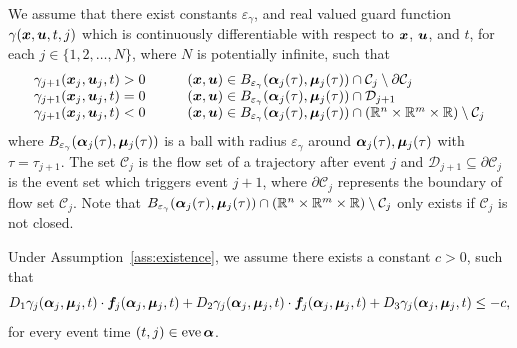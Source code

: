 \documentclass[../DC2019003Bouma.tex]{subfiles}
\begin{document}
\begin{sloppypar}
\begin{myass}\label{ass:existence}
We assume that there exist constants $\varepsilon_\gamma$, and real valued guard function $\gamma({\boldsymbol{x}},{\boldsymbol{u}},t,j)$ which is continuously differentiable with respect to ${\boldsymbol{x}}$, ${\boldsymbol{u}}$, and $t$, for each $j\in \{1,2,\dots,N\}$, where $N$ is potentially infinite, such that
\begin{equation}
\begin{array}{llll}
\gamma_{j+1}({\boldsymbol{x}}_j,{\boldsymbol{u}}_j,t) > 0 & &	&({\boldsymbol{x}},{\boldsymbol{u}}) \in B_{\varepsilon_\gamma}(\boldsymbol{\alpha}_j(\tau),\boldsymbol{\mu}_j(\tau))\cap \mathcal{C}_j\setminus\partial \mathcal{C}_j\\
\gamma_{j+1}({\boldsymbol{x}}_j,{\boldsymbol{u}}_j,t) = 0 & &	&({\boldsymbol{x}},{\boldsymbol{u}}) \in B_{\varepsilon_\gamma}(\boldsymbol{\alpha}_j(\tau),\boldsymbol{\mu}_j(\tau))\cap \mathcal{D}_{j+1}\\
\gamma_{j+1}({\boldsymbol{x}}_j,{\boldsymbol{u}}_j,t) < 0 & &	&({\boldsymbol{x}},{\boldsymbol{u}}) \in B_{\varepsilon_\gamma}(\boldsymbol{\alpha}_j(\tau),\boldsymbol{\mu}_j(\tau))\cap (\mathbb{R}^n \times \mathbb{R}^m \times \mathbb{R})\setminus \mathcal{C}_j
\end{array}
\end{equation}
where $B_{\varepsilon_\gamma}(\boldsymbol{\alpha}_j(\tau),\boldsymbol{\mu}_j(\tau))$ is a ball with radius $\varepsilon_{\gamma}$ around $\boldsymbol{\alpha}_j(\tau),\boldsymbol{\mu}_j(\tau)$ with $\tau = \tau_{j+1}$. The set $\mathcal{C}_j$ is the flow set of a trajectory after event $j$ and $\mathcal{D}_{j+1}\subseteq\partial \mathcal{C}_j$ is the event set which triggers event $j+1$, where $\partial \mathcal{C}_j$ represents the boundary of flow set $\mathcal{C}_j$. Note that $B_{\varepsilon_\gamma}(\boldsymbol{\alpha}_j(\tau),\boldsymbol{\mu}_j(\tau))\cap (\mathbb{R}^n \times \mathbb{R}^m \times \mathbb{R})\setminus \mathcal{C}_j$ only exists if $\mathcal{C}_j$ is not closed.
\end{myass}
\end{sloppypar}

\begin{sloppypar}
\begin{myass}\label{ass:transversality}
Under Assumption~\ref{ass:existence}, we assume there exists a constant $c>0$, such that
\begin{equation}
D_1\gamma_j(\boldsymbol{\alpha}_j,\boldsymbol{\mu}_j,t)\cdot{\boldsymbol{f}}_j(\boldsymbol{\alpha}_j,\boldsymbol{\mu}_j,t) + D_2\gamma_j(\boldsymbol{\alpha}_j,\boldsymbol{\mu}_j,t)\cdot{\boldsymbol{f}}_j(\boldsymbol{\alpha}_j,\boldsymbol{\mu}_j,t) + D_3\gamma_j(\boldsymbol{\alpha}_j,\boldsymbol{\mu}_j,t) \leq -c,
\end{equation}
for every event time $(t,j) \in \operatorname{\textnormal{eve}} \boldsymbol{\alpha}$.
\end{myass}
\end{sloppypar}
\end{document}
